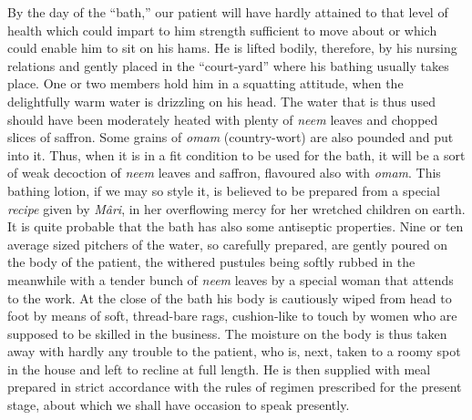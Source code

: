 \documentclass[a4paper, 12pt, oneside, english]{article}
\begin{document}
By the day of the ``bath,'' our patient will have hardly attained to that level of health which could impart to him strength sufficient to move about or which could enable him to sit on his hams. He is lifted bodily, therefore, by his nursing relations and gently placed in the ``court-yard'' where his bathing usually takes place. One or two members hold him in a squatting attitude, when the delightfully warm water is drizzling on his head. The water that is thus used should have been moderately heated with plenty of \emph{neem} leaves and chopped slices of saffron. Some grains of \emph{omam} (country-wort) are also pounded and put into it. Thus, when it is in a fit condition to be used for the bath, it will be a sort of weak decoction of \emph{neem} leaves and saffron, flavoured also with \emph{omam}. This bathing lotion, if we may so style it, is believed to be prepared from a special \emph{recipe} given by \emph{Mâri}, in her overflowing mercy for her wretched children on earth. It is quite probable that the bath has also some antiseptic properties. Nine or ten average sized pitchers of the water, so carefully prepared, are gently poured on the body of the patient, the withered pustules being softly rubbed in the meanwhile with a tender bunch of \emph{neem} leaves by a special woman that attends to the work. At the close of the bath his body is cautiously wiped from head to foot by means of soft, thread-bare rags, cushion-like to touch by women who are supposed to be skilled in the business. The moisture on the body is thus taken away with hardly any trouble to the patient, who is, next, taken to a roomy spot in the house and left to recline at full length. He is then supplied with meal prepared in strict accordance with the rules of regimen prescribed for the present stage, about which we shall have occasion to speak presently.
\end{document}
